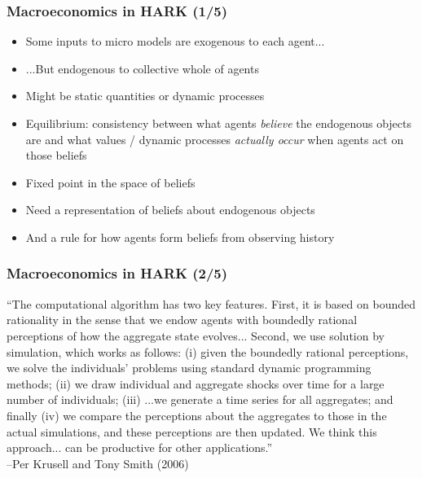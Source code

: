 \documentclass[11ptt]{beamer}
\newcommand{\bi}{\begin{itemize}}
\newcommand{\ei}{\end{itemize}}
\begin{document}

\begin{frame}\label{Macroeconomics}
\frametitle{Macroeconomics in HARK (1/5)}
\bi
\item <1->Some inputs to micro models are exogenous to each agent...

\item <1->...But endogenous to collective whole of agents

\item <1->Might be static quantities or dynamic processes

\item <2->Equilibrium: consistency between what agents \textit{believe} the endogenous objects are and what values / dynamic processes \textit{actually occur} when agents act on those beliefs

\item <2->Fixed point in the space of beliefs

\item <3->Need a representation of beliefs about endogenous objects

\item <3->And a rule for how agents form beliefs from observing history
\ei
\end{frame}


\begin{frame}
\frametitle{Macroeconomics in HARK (2/5)}
``The computational algorithm has two key features.  First, it is based on bounded rationality in the sense that we endow agents with boundedly rational perceptions of how the aggregate state evolves...  Second, we use solution by simulation, which works as follows: (i) given the boundedly rational perceptions, we solve the individuals' problems using standard dynamic programming methods; (ii) we draw individual and aggregate shocks over time for a large number of individuals; (iii) ...we generate a time series for all aggregates; and finally (iv) we compare the perceptions about the aggregates to those in the actual simulations, and these perceptions are then updated.  We think this approach... can be productive for other applications.''\\ --Per Krusell and Tony Smith (2006)
\end{frame}
\end{document}
